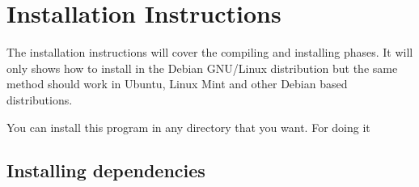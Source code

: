 \documentclass[pdftex,11pt,a4paper,titlepage]{report}
\begin{document}
\chapter{Installation Instructions}
\hspace{0.4cm} The installation instructions will cover the compiling and installing phases. It will only shows how to install in the Debian GNU/Linux distribution but the same method should work in Ubuntu, Linux Mint and other Debian based distributions.

You can install this program in any directory that you want. For doing it 

\section{Installing dependencies}
\end{document}
